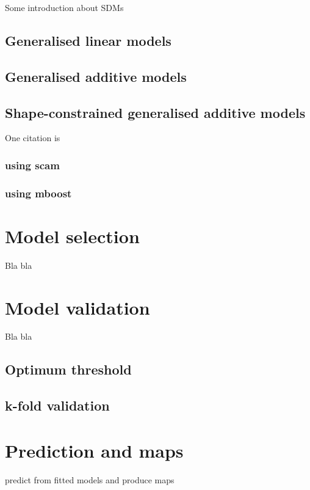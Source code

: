 \documentclass[
]{book}
\begin{document}
Some introduction about SDMs

\hypertarget{generalised-linear-models}{%
\section{Generalised linear models}\label{generalised-linear-models}}

\hypertarget{generalised-additive-models}{%
\section{Generalised additive models}\label{generalised-additive-models}}

\hypertarget{shape-constrained-generalised-additive-models}{%
\section{Shape-constrained generalised additive models}\label{shape-constrained-generalised-additive-models}}

One citation is \citep{citores_etal_2020}

\hypertarget{using-scam}{%
\subsection{using scam}\label{using-scam}}

\hypertarget{using-mboost}{%
\subsection{using mboost}\label{using-mboost}}

\hypertarget{model-selection}{%
\chapter{Model selection}\label{model-selection}}

Bla bla

\hypertarget{model-validation}{%
\chapter{Model validation}\label{model-validation}}

Bla bla

\hypertarget{optimum-threshold}{%
\section{Optimum threshold}\label{optimum-threshold}}

\hypertarget{k-fold-validation}{%
\section{k-fold validation}\label{k-fold-validation}}

\hypertarget{prediction-and-maps}{%
\chapter{Prediction and maps}\label{prediction-and-maps}}

predict from fitted models and produce maps

  
\end{document}
